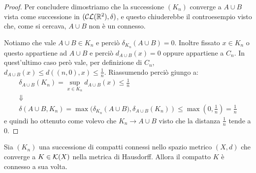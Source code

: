 \begin{proof}
	Per concludere dimostriamo che la successione $(K_n)$ converge a $A\cup B$ vista come successione in $(\mathcal{CL}(\mathbb R^2),\delta)$, e questo chiuderebbe il controesempio visto che, come si cercava, $A\cup B$ non è un connesso.
	
	Notiamo che vale $A\cup B\in K_n$ e perciò $\delta_{K_n}(A\cup B)=0$. 
	Inoltre fissato $x\in K_n$ o questo appartiene ad $A\cup B$ e perciò $d_{A\cup B}(x)=0$ oppure appartiene a $C_n$. In quest'ultimo caso però vale, per definizione di $C_n$, $d_{A\cup B}(x)\le d\left((n,0),x\right)\le \frac 1n$. Riassumendo perciò giungo a:
	\begin{gather*}
		\delta_{A\cup B}(K_n)=\sup_{x\in K_n} d_{A\cup B}(x)\le \frac 1n \\
		\Downarrow \\
		\delta(A\cup B,K_n)=\max(\delta_{K_n}\left(A\cup B),\delta_{A\cup B}(K_n)\right)\le \max\left(0,\frac1n\right)=\frac 1n
	\end{gather*}
	e quindi ho ottenuto come volevo che $K_n\to A\cup B$ visto che la distanza $\frac 1n$ tende a $0$.
\end{proof}

\begin{theorem}
	Sia $(K_n)$ una successione di compatti connessi nello spazio metrico $(X,d)$ che converge a $K\in\mathcal{K}(X)$ nella metrica di Hausdorff. Allora il compatto $K$ è connesso a sua volta.
\end{theorem}


